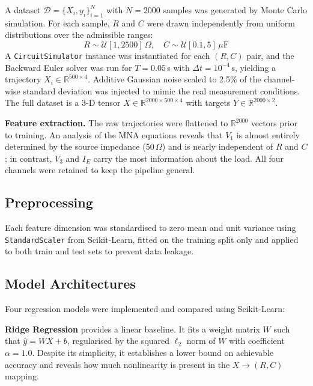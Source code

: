 \documentclass[journal,twocolumn]{IEEEtran}
\begin{document}
A dataset $\mathcal{D}=\{X_i,y_i\}_{i=1}^{N}$ with $N=2000$ samples was generated by Monte Carlo simulation. For each sample, $R$ and $C$ were drawn independently from uniform distributions over the admissible ranges:
\begin{equation}
R \sim \mathcal{U}[1, 2500]\,\Omega, \quad C \sim \mathcal{U}[0.1, 5]\,\mu\text{F}
\end{equation}
A \texttt{CircuitSimulator} instance was instantiated for each $(R,C)$ pair, and the Backward Euler solver was run for $T=0.05$\,s with $\Delta t = 10^{-4}$\,s, yielding a trajectory $X_i \in \mathbb{R}^{500\times4}$. Additive Gaussian noise scaled to 2.5\% of the channel-wise standard deviation was injected to mimic the real measurement conditions. The full dataset is a 3-D tensor $X \in \mathbb{R}^{2000\times500\times4}$ with targets $Y \in \mathbb{R}^{2000\times2}$.

\textbf{Feature extraction.} The raw trajectories were flattened to $\mathbb{R}^{2000}$ vectors prior to training. An analysis of the MNA equations reveals that $V_1$ is almost entirely determined by the source impedance (50\,$\Omega$) and is nearly independent of $R$ and $C$; in contrast, $V_3$ and $I_E$ carry the most information about the load. All four channels were retained to keep the pipeline general.

\subsection{Preprocessing}

Each feature dimension was standardised to zero mean and unit variance using \texttt{StandardScaler} from Scikit-Learn, fitted on the training split only and applied to both train and test sets to prevent data leakage.

\subsection{Model Architectures}

Four regression models were implemented and compared using Scikit-Learn:

\textbf{Ridge Regression} provides a linear baseline. It fits a weight matrix $W$ such that $\hat{y} = WX + b$, regularised by the squared $\ell_2$ norm of $W$ with coefficient $\alpha = 1.0$. Despite its simplicity, it establishes a lower bound on achievable accuracy and reveals how much nonlinearity is present in the $X\to(R,C)$ mapping.
\end{document}

